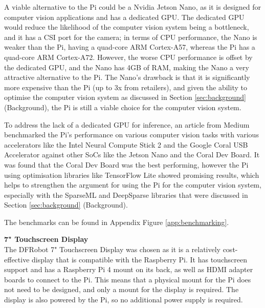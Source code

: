 A viable alternative to the Pi could be a Nvidia Jetson Nano\cite{jetsonnano}, as it is designed for computer vision applications and has a dedicated GPU. The dedicated GPU
would reduce the likelihood of the computer vision system being a bottleneck, and it has a CSI port for the camera; in terms of CPU performance, the Nano is weaker than the Pi,
having a quad-core ARM Cortex-A57, whereas the Pi has a quad-core ARM Cortex-A72\cite{pi4}. However, the worse CPU performance is offset by the dedicated GPU, and the Nano has 4GB of RAM, 
making the Nano a very attractive alternative to the Pi. The Nano's drawback is that it is significantly more expensive than the Pi (up to 3x from retailers), and
given the ability to optimise the computer vision system as discussed in Section \ref{sec:background} (Background), the Pi is still
a viable choice for the computer vision system.

To address the lack of a dedicated GPU for inference, an article from Medium\cite{benchmarks} benchmarked the Pi's performance on various computer vision tasks with 
various accelerators like the Intel Neural Compute Stick 2 and the Google Coral USB Accelerator against other SoCs like the Jetson Nano and the Coral Dev Board. 
It was found that the Coral Dev Board was the best performing, however the Pi using optimisation libraries like TensorFlow Lite showed  promising results, which
helps to strengthen the argument for using the Pi for the computer vision system, especially with the SparseML and DeepSparse libraries that were discussed in Section \ref{sec:background} (Background).

The benchmarks can be found in Appendix Figure \ref{app:benchmarking}.

\vspace{1em}
\noindent
\textbf{7" Touchscreen Display} \\
The DFRobot 7" Touchscreen Display was chosen as it is a relatively cost-effective display that is compatible with the Raspberry Pi.
It has touchscreen support and has a Raspberry Pi 4 mount on its back, as well as HDMI adapter boards to connect to the Pi.
This means that a physical mount for the Pi does not need to be designed, and only a mount for the display is required. The display is also powered by the Pi,
so no additional power supply is required. 

